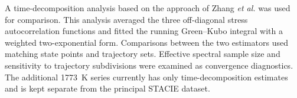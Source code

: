 A time-decomposition analysis based on the approach of Zhang \textit{et al.}\cite{Zhang2015} was used for comparison.
This analysis averaged the three off-diagonal stress autocorrelation functions and fitted the running Green--Kubo integral with a weighted two-exponential form.
Comparisons between the two estimators used matching state points and trajectory sets.
Effective spectral sample size and sensitivity to trajectory subdivisions were examined as convergence diagnostics.
The additional 1773~K series currently has only time-decomposition estimates and is kept separate from the principal STACIE dataset.

